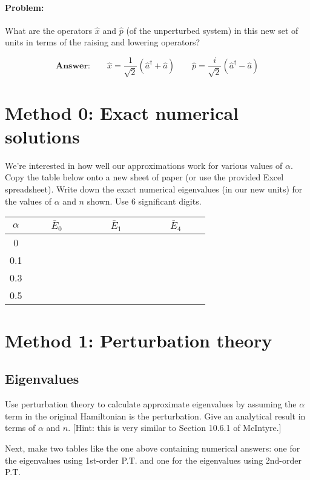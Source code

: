 \documentclass[fontsize=11pt,paper=letter,twoside=false,onecolumn]{article} %
\begin{document}
\paragraph*{Problem: }What are the operators $\hat{x}$ and $\hat{p}$ (of the unperturbed system) in this new set of units in terms of the raising and lowering operators?

\[
\textbf{Answer:}\qquad
\hat{x} = \frac{1}{\sqrt{2}}(\hat{a}^\dagger+\hat{a})
\qquad
\hat{p} = \frac{i}{\sqrt{2}}(\hat{a}^\dagger-\hat{a})
\]

\section{Method 0: Exact numerical solutions}
We're interested in how well our approximations work for various values of $\alpha$.
Copy the table below onto a new sheet of paper  (or use the provided Excel spreadsheet).  Write down the exact numerical eigenvalues (in our new units) for the values of $\alpha$ and $n$ shown.  Use 6 significant digits.

\begin{center}
\begin{tabular}{c|ccc}
$\alpha$ & $\qquad\bar{E}_0\qquad$ & $\qquad\bar{E}_1\qquad$ &  $\qquad\bar{E}_4\qquad$ \\
\hline
0 & & & \\
0.1 & & & \\
0.3 & & & \\
0.5 & & & \\
\end{tabular}
\end{center}

\section{Method 1: Perturbation theory}
\subsection{Eigenvalues}
Use perturbation theory to calculate approximate eigenvalues by assuming the $\alpha$ term in the original Hamiltonian is the perturbation.  Give an analytical result in terms of $\alpha$ and $n$.
[Hint: this is very similar to Section 10.6.1 of McIntyre.]

Next, make two tables like the one above containing numerical answers: one for the eigenvalues using 1st-order P.T. and one for the eigenvalues using 2nd-order P.T.
\end{document}
